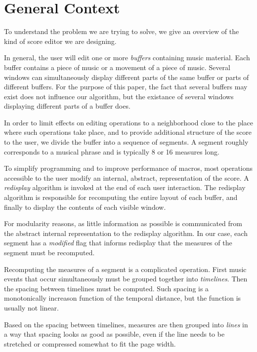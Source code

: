 \documentclass{article}
\begin{document}
\section{General Context}

To understand the problem we are trying to solve, we give an overview
of the kind of score editor we are designing.  

In general, the user will edit one or more \emph{buffers} containing
music material.  Each buffer contains a piece of music or a movement
of a piece of music.  Several windows can simultaneously display
different parts of the same buffer or parts of different buffers.  For
the purpose of this paper, the fact that several buffers may exist
does not influence our algorithm, but the existance of several windows
displaying different parts of a buffer does. 

In order to limit effects on editing operations to a neighborhood
close to the place where such operations take place, and to provide
additional structure of the score to the user, we divide the buffer
into a sequence of segments.  A segment roughly corresponds to a
musical phrase and is typically 8 or 16 measures long.

To simplify programming and to improve performance of macros, most
operations accessible to the user modify an internal, abstract,
representation of the score.  A \emph{redisplay} algorithm is invoked
at the end of each user interaction.  The redisplay algorithm is
responsible for recomputing the entire layout of each buffer, and
finally to display the contents of each visible window. 

For modularity reasons, as little information as possible is
communicated from the abstract internal representation to the
redisplay algorithm.  In our case, each segment has a \emph{modified}
flag that informs redisplay that the measures of the segment must be
recomputed.  

Recomputing the measures of a segment is a complicated operation.
First music events that occur simultaneously must be grouped together
into \emph{timelines}.  Then the spacing between timelines must be
computed.  Such spacing is a monotonically increason function of the
temporal distance, but the function is usually not linear. 

Based on the spacing between timelines, measures are then grouped into
\emph{lines} in a way that spacing looks as good as possible, even if
the line needs to be stretched or compressed somewhat to fit the page
width. 
\end{document}
